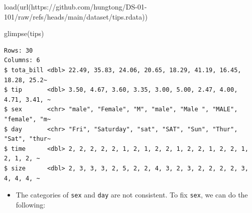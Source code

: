 \documentclass[
  letterpaper,
  DIV=11,
  numbers=noendperiod]{scrreprt}
\newenvironment{Shaded}{\begin{snugshade}}{\end{snugshade}}
\newcommand{\FunctionTok}[1]{\textcolor[rgb]{0.28,0.35,0.67}{#1}}
\newcommand{\NormalTok}[1]{\textcolor[rgb]{0.00,0.23,0.31}{#1}}
\newcommand{\OtherTok}[1]{\textcolor[rgb]{0.00,0.23,0.31}{#1}}
\newcommand{\SpecialCharTok}[1]{\textcolor[rgb]{0.37,0.37,0.37}{#1}}
\newcommand{\StringTok}[1]{\textcolor[rgb]{0.13,0.47,0.30}{#1}}
\providecommand{\tightlist}{%
  \setlength{\itemsep}{0pt}\setlength{\parskip}{0pt}}\usepackage{longtable,booktabs,array}
\begin{document}
\begin{Shaded}
\begin{Highlighting}[]
\FunctionTok{load}\NormalTok{(}\FunctionTok{url}\NormalTok{(}\StringTok{\textquotesingle{}https://github.com/hungtong/DS{-}01{-}101/raw/refs/heads/main/dataset/tips.rdata\textquotesingle{}}\NormalTok{))}

\FunctionTok{glimpse}\NormalTok{(tips)}
\end{Highlighting}
\end{Shaded}

\begin{verbatim}
Rows: 30
Columns: 6
$ tota_bill <dbl> 22.49, 35.83, 24.06, 20.65, 18.29, 41.19, 16.45, 18.28, 25.2~
$ tip       <dbl> 3.50, 4.67, 3.60, 3.35, 3.00, 5.00, 2.47, 4.00, 4.71, 3.41, ~
$ sex       <chr> "male", "Female", "M", "male", "Male ", "MALE", "female", "m~
$ day       <chr> "Fri", "Saturday", "sat", "SAT", "Sun", "Thur", "Sat", "thur~
$ time      <dbl> 2, 2, 2, 2, 2, 1, 2, 1, 2, 2, 1, 2, 2, 1, 2, 2, 1, 2, 1, 2, ~
$ size      <dbl> 2, 3, 3, 3, 2, 5, 2, 2, 4, 3, 2, 3, 2, 2, 2, 2, 3, 4, 4, 4, ~
\end{verbatim}

\begin{itemize}
\tightlist
\item
  The categories of \texttt{sex} and \texttt{day} are not consistent. To
  fix \texttt{sex}, we can do the following:
\end{itemize}

\begin{Shaded}
\end{Shaded}
\end{document}
